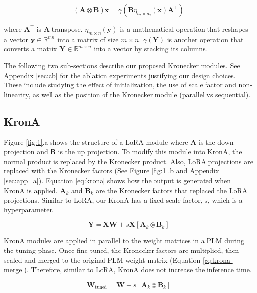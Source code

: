 \begin{equation}
    (\mathbf{A} \otimes \mathbf{B})\mathbf{x} = \gamma(\mathbf{B}\eta_{b_2\times a_2}(\mathbf{x})\mathbf{A^\top})
\label{eq:kronecker_equivalance}
\end{equation}

where  $\mathbf{A}^\top$ is $\mathbf{A}$ transpose. $\eta_{m \times n}(\mathbf{y})$ is a mathematical operation that reshapes a vector  $\mathbf{y} \in \mathbb{R}^{mn}$  into a matrix of size $m \times n$. $\gamma(\mathbf{Y})$ is another operation that converts a matrix  $\mathbf{Y} \in \mathbb{R}^{m\times n}$ into a vector by stacking its columns. 

The following two sub-sections describe our proposed Kronecker modules. See Appendix \ref{sec:ab} for the ablation experiments justifying our design choices. These include studying the effect of initialization, the use of scale factor and non-linearity, as well as the position of the Kronecker module (parallel vs sequential). 

\subsection{KronA}
Figure \ref{fig:1}.a shows the structure of a LoRA module where $\mathbf{A}$ is the down projection and $\mathbf{B}$ is the up projection. To modify this module into KronA, the normal product is replaced by the Kronecker product. Also, LoRA projections are replaced with the Kronecker factors (See Figure \ref{fig:1}.b and Appendix  \ref{sec:app_a}). Equation \ref{eq:krona} shows how the output is generated when KronA is applied. $\mathbf{A}_k$ and $\mathbf{B}_k$ are the Kronecker factors that replaced the LoRA projections. Similar to LoRA, our KronA has a fixed scale factor, $s$, which is a hyperparameter.

\begin{equation}
\label{eq:krona}
\mathbf{Y}= \mathbf{X}\mathbf{W} + s\mathbf{X}[\mathbf{A}_k\otimes\mathbf{B}_k]
\end{equation}

KronA modules are applied in parallel to the weight matrices in a PLM during the tuning phase. Once fine-tuned, the Kronecker factors are multiplied, then scaled and merged to the original PLM weight matrix (Equation \ref{eq:krona-merge}). Therefore, similar to LoRA, KronA does not increase the inference time.

\begin{equation}
\label{eq:krona-merge}
\mathbf{W}_{\text{tuned}}=\mathbf{W}+s[\mathbf{A}_k\otimes\mathbf{B}_k]
\end{equation}

